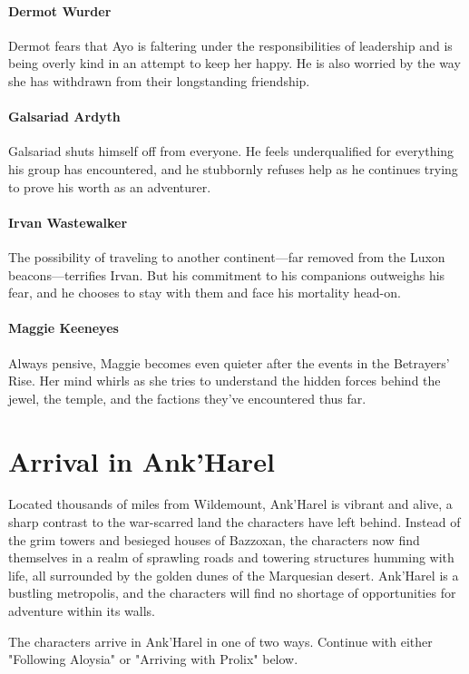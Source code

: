 \documentclass[10pt,a4paper,twoside,twocolumn,openany,nodeprecatedcode]{dndbook}
\begin{document}
\paragraph{Dermot Wurder}
Dermot fears that Ayo is faltering under the responsibilities of leadership and is being overly kind in an attempt to keep her happy. He is also worried by the way she has withdrawn from their longstanding friendship.

\paragraph{Galsariad Ardyth}
Galsariad shuts himself off from everyone. He feels underqualified for everything his group has encountered, and he stubbornly refuses help as he continues trying to prove his worth as an adventurer.

\paragraph{Irvan Wastewalker}
The possibility of traveling to another continent—far removed from the Luxon beacons—terrifies Irvan. But his commitment to his companions outweighs his fear, and he chooses to stay with them and face his mortality head-on.

\paragraph{Maggie Keeneyes}
Always pensive, Maggie becomes even quieter after the events in the Betrayers' Rise. Her mind whirls as she tries to understand the hidden forces behind the jewel, the temple, and the factions they've encountered thus far.

\section{Arrival in Ank'Harel}
Located thousands of miles from Wildemount, Ank'Harel is vibrant and alive, a sharp contrast to the war-scarred land the characters have left behind. Instead of the grim towers and besieged houses of Bazzoxan, the characters now find themselves in a realm of sprawling roads and towering structures humming with life, all surrounded by the golden dunes of the Marquesian desert. Ank'Harel is a bustling metropolis, and the characters will find no shortage of opportunities for adventure within its walls.

The characters arrive in Ank'Harel in one of two ways. Continue with either "Following Aloysia" or "Arriving with Prolix" below.
\end{document}
